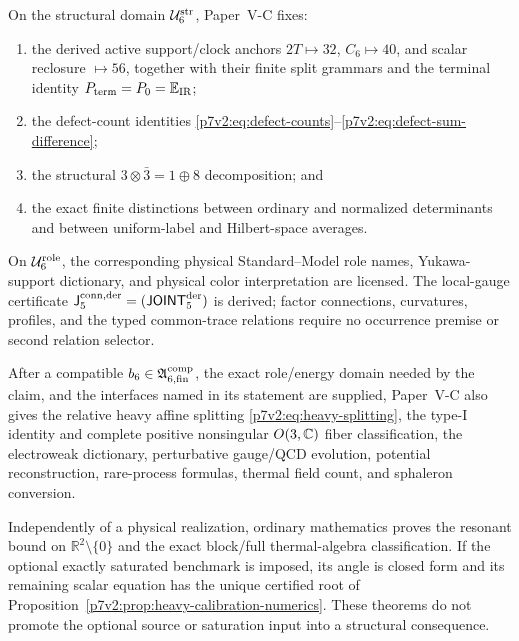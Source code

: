 \documentclass[11pt,a4paper]{article}
\newcommand{\Rconn}{\mathsf J_5^{\rm conn,der}}
\newcommand{\JOINTfiveocc}{\mathsf{JOINT}_{5}^{\rm der}}
\newcommand{\Ustr}{\mathcal U_6^{\rm str}}
\newcommand{\Urole}{\mathcal U_6^{\rm role}}
\newcommand{\Acompsix}{\mathfrak A_{6,{\rm fin}}^{\rm comp}}
\begin{document}
\begin{theorem}
\label{p7v2:thm:final-boundary}
On the structural domain \(\Ustr\), Paper~V-C fixes:
\begin{enumerate}[label=(\roman*),leftmargin=2.5em]
  \item the derived active support/clock anchors
  \(2T\mapsto32\), \(C_6\mapsto40\), and scalar reclosure
  \(\mapsto56\), together with their finite split grammars and the terminal
  identity \(P_{\rm term}=P_0=\mathbb E_{\rm IR}\);
  \item the defect-count identities
  \eqref{p7v2:eq:defect-counts}--\eqref{p7v2:eq:defect-sum-difference};
  \item the structural \(3\otimes\bar3=1\oplus8\) decomposition; and
  \item the exact finite distinctions between ordinary and normalized
  determinants and between uniform-label and Hilbert-space averages.
\end{enumerate}
On \(\Urole\), the corresponding physical Standard--Model role names,
Yukawa-support dictionary, and physical color interpretation are licensed.
The local-gauge certificate \(\Rconn=(\JOINTfiveocc)\) is derived; factor
connections, curvatures, profiles, and the typed common-trace relations
require no occurrence premise or second relation selector.

After a compatible \(b_6\in\Acompsix\), the exact role/energy domain needed by
the claim, and the interfaces named in its statement are supplied, Paper~V-C
also gives the relative heavy affine splitting
\eqref{p7v2:eq:heavy-splitting}, the type-I identity and complete positive
nonsingular \(O(3,\mathbb{C})\) fiber classification, the electroweak dictionary,
perturbative gauge/QCD evolution, potential reconstruction, rare-process
formulas, thermal field count, and sphaleron conversion.

Independently of a physical realization, ordinary mathematics proves the
resonant bound on \(\mathbb R^2\setminus\{0\}\) and the exact block/full
thermal-algebra classification.  If the optional exactly saturated benchmark
is imposed, its angle is closed form and its remaining scalar equation has the
unique certified root of
Proposition~\ref{p7v2:prop:heavy-calibration-numerics}.  These theorems do not
promote the optional source or saturation input into a structural consequence.


\end{theorem}
\end{document}
